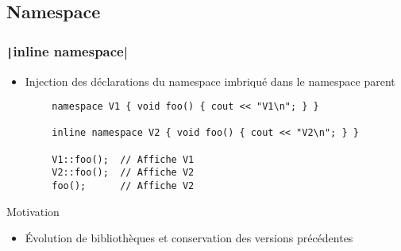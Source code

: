 \documentclass[C++.tex]{subfiles}
\begin{document}
\subsection*{Namespace}
\begin{frame}[fragile]
	\frametitle{\texttt|inline namespace|}
	\begin{itemize}
		\item Injection des déclarations du namespace imbriqué dans le namespace parent
	\end{itemize}

	\begin{verbatim}
		namespace V1 { void foo() { cout << "V1\n"; } }

		inline namespace V2 { void foo() { cout << "V2\n"; } }

		V1::foo();  // Affiche V1
		V2::foo();  // Affiche V2
		foo();      // Affiche V2
	\end{verbatim}

	\begin{block}{Motivation}
		\begin{itemize}
			\item Évolution de bibliothèques et conservation des versions précédentes
		\end{itemize}
	\end{block}


\end{frame}
\end{document}
